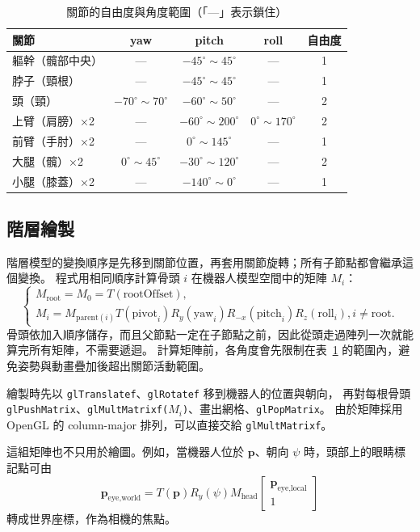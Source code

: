 \begin{table}[H]
    \centering
    \caption{關節的自由度與角度範圍（「—」表示鎖住）}
    \label{tab:dof}
    \small
    \begin{tabular}{lcccc}
        \toprule
        關節       & yaw                       & pitch                      & roll                     & 自由度 \\
        \midrule
        軀幹（髖部中央） & —                         & $-45^\circ \sim 45^\circ$  & —                        & 1   \\
        脖子（頸根）   & —                         & $-45^\circ \sim 45^\circ$  & —                        & 1   \\
        頭（頸）     & $-70^\circ \sim 70^\circ$ & $-60^\circ \sim 50^\circ$  & —                        & 2   \\
        上臂（肩膀）×2 & —                         & $-60^\circ \sim 200^\circ$ & $0^\circ \sim 170^\circ$ & 2   \\
        前臂（手肘）×2 & —                         & $0^\circ \sim 145^\circ$   & —                        & 1   \\
        大腿（髖）×2  & $0^\circ \sim 45^\circ$   & $-30^\circ \sim 120^\circ$ & —                        & 2   \\
        小腿（膝蓋）×2 & —                         & $-140^\circ \sim 0^\circ$  & —                        & 1   \\
        \bottomrule
    \end{tabular}
\end{table}

\subsection{階層繪製}

階層模型的變換順序是先移到關節位置，再套用關節旋轉；所有子節點都會繼承這個變換。
程式用相同順序計算骨頭 $i$ 在機器人模型空間中的矩陣 $M_i$：
$$
    \begin{cases}
        M_{\text{root}} = M_0 = T(\text{rootOffset}), \\
        M_i = M_{\text{parent}(i)} T(\text{pivot}_i)
        R_y(\text{yaw}_i) R_{-x}(\text{pitch}_i) R_z(\text{roll}_i), i \neq \text{root}.
    \end{cases}
$$
骨頭依加入順序儲存，而且父節點一定在子節點之前，因此從頭走過陣列一次就能算完所有矩陣，不需要遞迴。
計算矩陣前，各角度會先限制在表~\ref{tab:dof} 的範圍內，避免姿勢與動畫疊加後超出關節活動範圍。

繪製時先以 \lstinline|glTranslatef|、\lstinline|glRotatef| 移到機器人的位置與朝向，
再對每根骨頭 \lstinline|glPushMatrix|、\lstinline|glMultMatrixf(|$M_i$\lstinline|)|、畫出網格、\lstinline|glPopMatrix|。
由於矩陣採用 OpenGL 的 column-major 排列，可以直接交給 \lstinline|glMultMatrixf|。

這組矩陣也不只用於繪圖。例如，當機器人位於 $\mathbf{p}$、朝向 $\psi$ 時，頭部上的眼睛標記點可由
$$
    \mathbf{p}_{\text{eye,world}} = T(\mathbf{p})R_y(\psi)M_{\text{head}}
    \begin{bmatrix}\mathbf{p}_{\text{eye,local}}\\1\end{bmatrix}
$$
轉成世界座標，作為相機的焦點。
